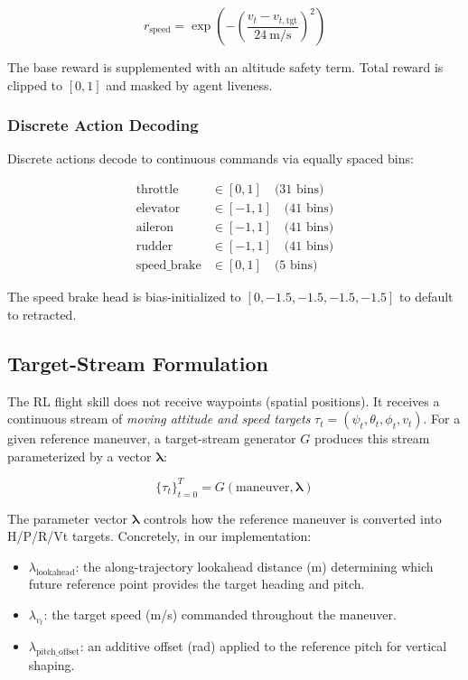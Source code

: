 \documentclass{article}
\begin{document}
\begin{equation}
  r_{\text{speed}} = \exp\left(-\left(\frac{v_t - v_{t,\text{tgt}}}{24~\text{m/s}}\right)^2\right)
\end{equation}

The base reward is supplemented with an altitude safety term.
Total reward is clipped to $[0, 1]$ and masked by agent liveness.

\subsubsection{Discrete Action Decoding}

Discrete actions decode to continuous commands via equally spaced bins:

\begin{align}
  \text{throttle} &\in [0, 1] \quad \text{(31 bins)} \\
  \text{elevator} &\in [-1, 1] \quad \text{(41 bins)} \\
  \text{aileron}  &\in [-1, 1] \quad \text{(41 bins)} \\
  \text{rudder}   &\in [-1, 1] \quad \text{(41 bins)} \\
  \text{speed\_brake} &\in [0, 1] \quad \text{(5 bins)}
\end{align}

The speed brake head is bias-initialized to $[0, -1.5, -1.5, -1.5, -1.5]$ to default to retracted.

\subsection{Target-Stream Formulation}

The RL flight skill does not receive waypoints (spatial positions).
It receives a continuous stream of \emph{moving attitude and speed targets} $\tau_t = (\psi_t, \theta_t, \phi_t, v_t)$.
For a given reference maneuver, a target-stream generator $G$ produces this stream parameterized by a vector $\bm{\lambda}$:

\begin{equation}
  \{\tau_t\}_{t=0}^{T} = G(\text{maneuver}, \bm{\lambda})
\end{equation}

The parameter vector $\bm{\lambda}$ controls how the reference maneuver is converted into H/P/R/Vt targets.
Concretely, in our implementation:

\begin{itemize}
  \item $\lambda_{\text{lookahead}}$: the along-trajectory lookahead distance (m) determining which future reference point provides the target heading and pitch.
  \item $\lambda_{v_t}$: the target speed (m/s) commanded throughout the maneuver.
  \item $\lambda_{\text{pitch\_offset}}$: an additive offset (rad) applied to the reference pitch for vertical shaping.
\end{itemize}
\end{document}
